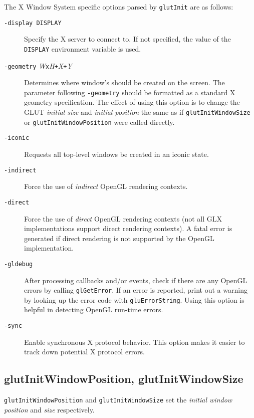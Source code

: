 The X Window System specific options parsed by {\tt glutInit} are as follows:
\begin{description}
\item[\tt -display DISPLAY]
Specify the X server to connect to.  If not specified, the
value of the {\tt DISPLAY} environment variable is used.

\item[{\tt -geometry} {\em W}{\tt x}{\em H}{\tt +}{\em X}{\tt +}{\em Y}]
Determines where window's should be created on the screen.  The
parameter following {\tt -geometry} should be formatted as a standard X geometry specification.
The effect of using this option is to change the GLUT
{\em initial size} and {\em initial position} the same as if
{\tt glutInitWindowSize} or {\tt glutInitWindowPosition}
were called directly.

\item[\tt -iconic]
Requests all top-level windows be created in an iconic state.

\item[\tt -indirect]
Force the use of {\em indirect} OpenGL rendering contexts.

\item[\tt -direct]
Force the use of {\em direct}
OpenGL rendering contexts (not all GLX implementations support
direct rendering contexts).  A fatal error is generated if direct
rendering is not supported by the OpenGL implementation.

\item[\tt -gldebug]
After processing callbacks and/or events, check if there are any OpenGL
errors by calling {\tt glGetError}.  If an error is reported, print out
a warning by looking up the error code with {\tt gluErrorString}.  Using
this option is helpful in detecting OpenGL run-time errors.

\item[\tt -sync]
Enable synchronous X protocol behavior.  This option makes it easier
to track down potential X protocol errors.

\end{description}

\subsection{glutInitWindowPosition, glutInitWindowSize}

{\tt glutInitWindowPosition} and {\tt glutInitWindowSize} set the
{\em initial window position} and {\em size} respectively.

